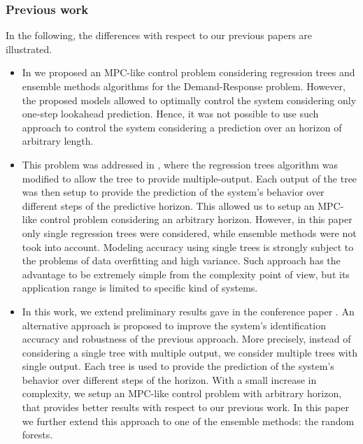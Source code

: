 \textcolor[rgb]{0,0,1}{
\subsubsection{Previous work}\label{SSS:PreviousWork}
In the following, the differences with respect to our previous papers are illustrated.
\begin{itemize}
	\item In \cite{Behl2016} we	proposed an MPC-like control problem considering regression trees and ensemble methods algorithms for the Demand-Response problem. However, the proposed models allowed to optimally control the system considering only one-step lookahead prediction.
	Hence, it was not possible to use such approach to control the system considering a prediction over an horizon of arbitrary length.
	\item This problem was addressed in \cite{Jain2016}, where the regression trees algorithm was modified to allow the tree to provide multiple-output.
	Each output of the tree was then setup to provide the prediction of the system's behavior over different steps of the predictive horizon.
	This allowed us to setup an MPC-like control problem considering an arbitrary horizon.
	However, in this paper only single regression trees were considered, while ensemble methods were not took into account.
	Modeling accuracy using single trees is strongly subject to the problems of data overfitting and high variance.
	Such approach has the advantage to be extremely simple from the complexity point of view, but its application range is limited to specific kind of systems.
	\item In this work, we extend preliminary results gave in the conference paper \cite{JainCDC2017}.
	An alternative approach is proposed to improve the system's identification accuracy and robustness of the previous approach.
	More precisely, instead of considering a single tree with multiple output, we consider multiple trees with single output.
	Each tree is used to provide the prediction of the system's behavior over different steps of the horizon. With a small increase in complexity, we setup an MPC-like control problem with arbitrary horizon, that provides better results with respect to our previous work. In this paper we further extend this approach to one of the ensemble methods: the random forests.
\end{itemize}
}

